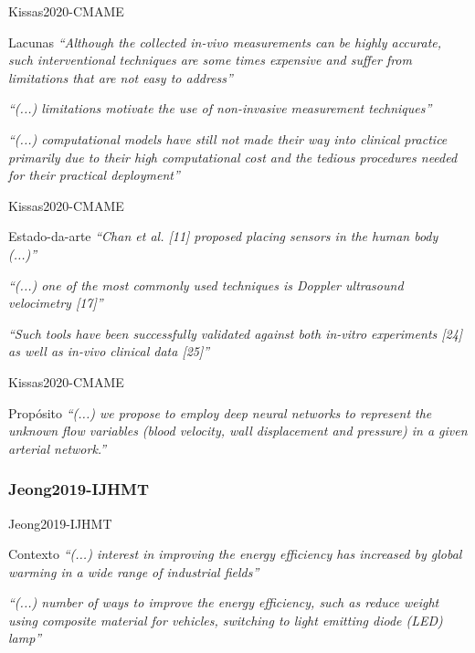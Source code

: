 \begin{frame}{Kissas2020-CMAME} 
\begin{block}{Lacunas}
\emph{``Although the collected in-vivo measurements can be highly accurate, such interventional techniques  are some times expensive and suffer from limitations that are not easy to address''}

\emph{``(...) limitations motivate the use of non-invasive measurement techniques''}

\emph{``(...) computational models have still not made their way into clinical practice primarily due to their high computational cost and the tedious procedures needed for their practical deployment''}
\end{block}
\end{frame}

\begin{frame}{Kissas2020-CMAME} 
\begin{block}{Estado-da-arte}
\emph{``Chan et al. [11] proposed placing sensors in the human body (...)''}

\emph{``(...) one of the most commonly used techniques is Doppler ultrasound velocimetry [17]''}

\emph{``Such tools have been successfully validated against both in-vitro experiments [24] as well  as in-vivo clinical data [25]''}
\end{block}
\end{frame}

\begin{frame}{Kissas2020-CMAME} 
\begin{block}{Propósito}
\emph{``(...) we propose to employ deep neural networks to represent the unknown flow variables (blood velocity, wall displacement and pressure) in a given arterial network.''} 
\end{block}
\end{frame}

\subsubsection*{Jeong2019-IJHMT}

\begin{frame}{Jeong2019-IJHMT} 
\begin{block}{Contexto}
\emph{``(...) interest in improving the energy efficiency has increased by global warming in a wide range of industrial fields''} 

\emph{``(...) number of ways to improve the energy efficiency, such as reduce weight using composite material for vehicles, switching to light emitting diode (LED) lamp''} 
 \end{block}
\end{frame}

